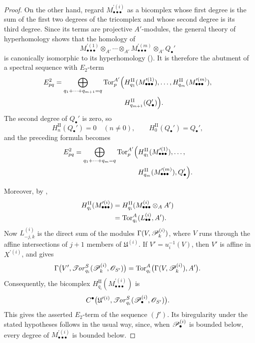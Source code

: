 \begin{proof}
On the other hand, regard
$M_{\bullet\bullet\bullet}^{\prime(i)}$ as a bicomplex whose first
degree is the sum of the first two degrees of the tricomplex and
whose second degree is its third degree.  Since its terms are
projective $A'$-modules, the general theory of hyperhomology shows
that the homology of
\[
  M_{\bullet\bullet\bullet}^{\prime(1)}
  \otimes_{A'}\cdots\otimes_{A'}
  M_{\bullet\bullet\bullet}^{\prime(m)}
  \otimes_{A'}Q_\bullet'
\]
is canonically isomorphic to its hyperhomology
().  It is therefore the abutment of a spectral
sequence with $E_2$-term
\[
\begin{split}
  E_{pq}^2
  =
  \bigoplus_{q_1+\cdots+q_{m+1}=q}
  \operatorname{Tor}_p^{A'}
  \Bigl(
    &
    H_{q_1}^{\mathrm{II}}
    (M_{\bullet\bullet\bullet}^{\prime(1)}),\ldots,
    H_{q_m}^{\mathrm{II}}
    (M_{\bullet\bullet\bullet}^{\prime(m)}),
    \\
    &
    H_{q_{m+1}}^{\mathrm{II}}(Q_\bullet')
  \Bigr).
\end{split}
\]
The second degree of $Q_\bullet'$ is zero, so
\[
  H_n^{\mathrm{II}}(Q_\bullet')=0
  \quad(n\neq0),
  \qquad
  H_0^{\mathrm{II}}(Q_\bullet')=Q_\bullet',
\]
and the preceding formula becomes
\[
\begin{split}
  E_{pq}^2
  =
  \bigoplus_{q_1+\cdots+q_m=q}
  \operatorname{Tor}_p^{A'}
  \Bigl(
    &
    H_{q_1}^{\mathrm{II}}
    (M_{\bullet\bullet\bullet}^{\prime(1)}),\ldots,
    \\
    &
    H_{q_m}^{\mathrm{II}}
    (M_{\bullet\bullet\bullet}^{\prime(m)}),
    Q_\bullet'
  \Bigr).
\end{split}
\]

Moreover, by ,
\[
\begin{split}
  H_{q_i}^{\mathrm{II}}
  (M_{\bullet\bullet\bullet}^{\prime(i)})
  &=
  H_{q_i}^{\mathrm{II}}
  (M_{\bullet\bullet\bullet}^{(i)}\otimes_AA')
  \\
  &=
  \operatorname{Tor}_{q_i}^A(L_{\bullet\bullet}^{(i)},A').
\end{split}
\]
Now $L_{-j,k}^{(i)}$ is the direct sum of the modules
$\Gamma(V,\mathscr{P}_k^{(i)})$, where $V$ runs through the affine
intersections of $j+1$ members of $\mathfrak U^{(i)}$.  If
$V'=u_i^{-1}(V)$, then $V'$ is affine in $X^{\prime(i)}$, and
 gives
\[
  \Gamma
  \bigl(
    V',
    \mathscr{T}\!\mathit{or}_{q_i}^S
    (\mathscr{P}_k^{(i)},\mathscr{O}_{S'})
  \bigr)
  =
  \operatorname{Tor}_{q_i}^A
  \bigl(
    \Gamma(V,\mathscr{P}_k^{(i)}),A'
  \bigr).
\]
Consequently, the bicomplex
$H_{q_i}^{\mathrm{II}}
(M_{\bullet\bullet\bullet}^{\prime(i)})$
is
\[
  C^\bullet
  \bigl(
    \mathfrak U^{\prime(i)},
    \mathscr{T}\!\mathit{or}_{q_i}^S
    (\mathscr{P}_\bullet^{(i)},\mathscr{O}_{S'})
  \bigr).
\]
This gives the asserted $E_2$-term of the sequence $(f')$.  Its
biregularity under the stated hypotheses follows in the usual way,
since, when $\mathscr{P}_\bullet^{(i)}$ is bounded below, every degree of
$M_{\bullet\bullet\bullet}^{\prime(i)}$ is bounded below.
\end{proof}

